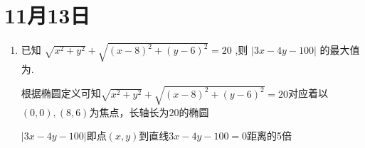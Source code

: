 \section*{11月13日}
\begin{enumerate}

    \item 已知 $\sqrt{{x}^{2} + {y}^{2}} + \sqrt{{\left( x - 8\right) }^{2} + {\left( y - 6\right) }^{2}} = {20}$ ,则 $\left| {{3x} - {4y} - {100}}\right|$ 的最大值为.
    \begin{jieda}
        根据椭圆定义可知$\sqrt{{x}^{2} + {y}^{2}} + \sqrt{{\left( x - 8\right) }^{2} + {\left( y - 6\right) }^{2}} = {20}$对应着以$(0, 0), (8, 6)$为焦点，长轴长为$20$的椭圆

        $\left| {{3x} - {4y} - {100}}\right|$即点$(x, y)$到直线$3x - {4y} - 100 = 0$距离的5倍


\end{jieda}
\end{enumerate}
